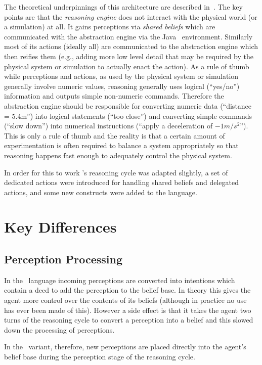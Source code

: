 The theoretical underpinnings of this architecture are described in~\cite{DALT10:abstraction,Dennis2016}.  The key points are that the \emph{reasoning engine} does not interact with the physical world (or a simulation) at all.  It gains perceptions via \emph{shared beliefs} which are communicated with the abstraction engine via the Java \eass\ environment.  Similarly most of its actions (ideally all) are communicated to the abstraction engine which then reifies them (e.g., adding more low level detail that may be required by the physical system or simulation to actually enact the action).  As a rule of thumb while perceptions and actions, as used by the physical system or simulation generally involve numeric values, reasoning generally uses logical (``yes/no'') information and outputs simple non-numeric commands.  Therefore the abstraction engine should be responsible for converting numeric data (``distance = 5.4m'') into logical statements (``too close'') and converting simple commands (``slow down'') into numerical instructions (``apply a deceleration of $-1m/s^2$'').  This is only a rule of thumb and the reality is that a certain amount of experimentation is often required to balance a system appropriately so that reasoning happens fast enough to adequately control the physical system.

In order for this to work \gwendolen's reasoning cycle was adapted slightly, a set of dedicated actions were introduced for handling shared beliefs and delegated actions, and some new constructs were added to the language.

\section{Key Differences}
\subsection{Perception Processing}
In the \gwendolen\ language incoming perceptions are converted into intentions which contain a deed to add the perception to the belief base.  In theory this gives the agent more control over the contents of its beliefs (although in practice no use has ever been made of this).  However a side effect is that it takes the agent two turns of the reasoning cycle to convert a perception into a belief and this slowed down the processing of perceptions.

In the \eass\ variant, therefore, new perceptions are placed directly into the agent's belief base during the perception stage of the reasoning cycle.

